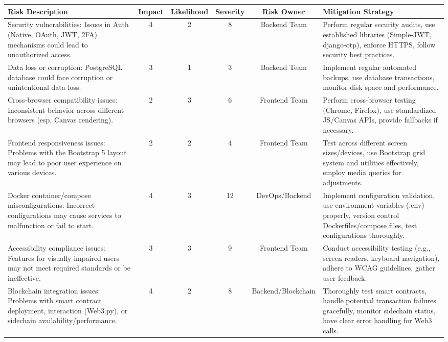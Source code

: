 \begin{table}[H]
    \small
    \centering
    \renewcommand{\arraystretch}{1.0}
    \begin{tabular}{|p{4cm}|c|c|c|c|p{5.5cm}|}
    \hline
    \textbf{Risk Description} & \textbf{Impact} & \textbf{Likelihood} & \textbf{Severity} & \textbf{Risk Owner} & \textbf{Mitigation Strategy} \\
    \hline
    Security vulnerabilities: Issues in Auth (Native, OAuth, JWT, 2FA) mechanisms could lead to unauthorized access. & 4 & 2 & 8 & Backend Team & Perform regular security audits, use established libraries (Simple-JWT, django-otp), enforce HTTPS, follow security best practices. \\
    \hline
    Data loss or corruption: PostgreSQL database could face corruption or unintentional data loss. & 3 & 1 & 3 & Backend Team & Implement regular automated backups, use database transactions, monitor disk space and performance. \\
    \hline
    Cross-browser compatibility issues: Inconsistent behavior across different browsers (esp. Canvas rendering). & 2 & 3 & 6 & Frontend Team & Perform cross-browser testing (Chrome, Firefox), use standardized JS/Canvas APIs, provide fallbacks if necessary. \\
    \hline
    Frontend responsiveness issues: Problems with the Bootstrap 5 layout may lead to poor user experience on various devices. & 2 & 2 & 4 & Frontend Team & Test across different screen sizes/devices, use Bootstrap grid system and utilities effectively, employ media queries for adjustments. \\
    \hline
    Docker container/compose misconfigurations: Incorrect configurations may cause services to malfunction or fail to start. & 4 & 3 & 12 & DevOps/Backend & Implement configuration validation, use environment variables (.env) properly, version control Dockerfiles/compose files, test configurations thoroughly. \\
    \hline
    Accessibility compliance issues: Features for visually impaired users may not meet required standards or be ineffective. & 3 & 3 & 9 & Frontend Team & Conduct accessibility testing (e.g., screen readers, keyboard navigation), adhere to WCAG guidelines, gather user feedback. \\
    \hline
    Blockchain integration issues: Problems with smart contract deployment, interaction (Web3.py), or sidechain availability/performance. & 4 & 2 & 8 & Backend/Blockchain & Thoroughly test smart contracts, handle potential transaction failures gracefully, monitor sidechain status, have clear error handling for Web3 calls. \\

\end{tabular}
\end{table}
